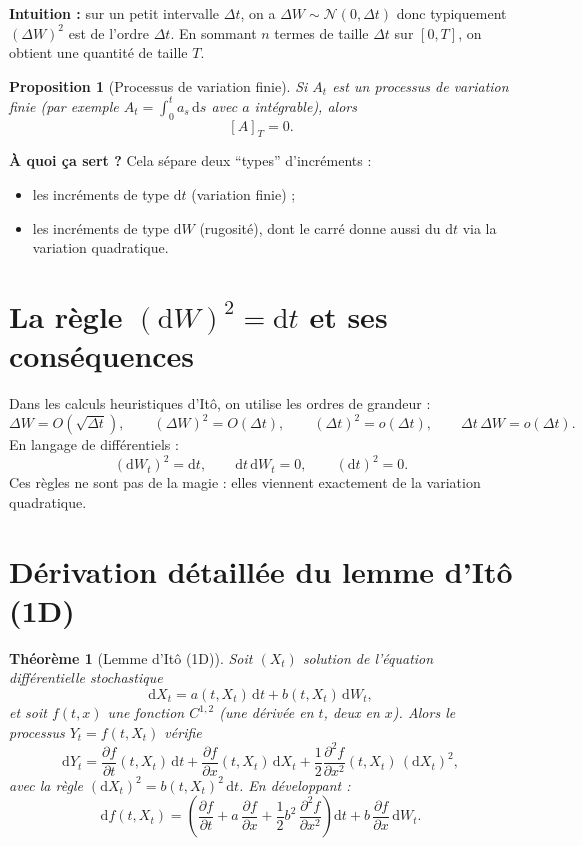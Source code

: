 \documentclass[11pt,a4paper]{report}
\newcommand{\dd}{\mathrm{d}}
\newcommand{\1}{\mathbbm{1}}
\newcommand{\Normal}{\mathcal{N}}
\newcommand{\pd}[2]{\frac{\partial #1}{\partial #2}}
\newcommand{\pdd}[2]{\frac{\partial^2 #1}{\partial #2^2}}
\theoremstyle{definition}
\theoremstyle{plain}
\newtheorem{proposition}{Proposition}[chapter]
\newtheorem{theorem}{Théorème}[chapter]
\theoremstyle{remark}
\begin{document}
\textbf{Intuition :} sur un petit intervalle $\Delta t$, on a $\Delta W \sim \Normal(0,\Delta t)$ donc typiquement $(\Delta W)^2$ est de l'ordre $\Delta t$.
En sommant $n$ termes de taille $\Delta t$ sur $[0,T]$, on obtient une quantité de taille $T$.

\begin{proposition}[Processus de variation finie]
Si $A_t$ est un processus de variation finie (par exemple $A_t=\int_0^t a_s\,\dd s$ avec $a$ intégrable),
alors
\[
[A]_T=0.
\]
\end{proposition}

\textbf{À quoi ça sert ?}
Cela sépare deux ``types'' d'incréments :
\begin{itemize}
\item les incréments de type $\dd t$ (variation finie) ;
\item les incréments de type $\dd W$ (rugosité), dont le carré donne aussi du $\dd t$ via la variation quadratique.
\end{itemize}

\section{La règle \texorpdfstring{$(\dd W)^2=\dd t$}{(dW)^2=dt} et ses conséquences}
\label{sec:dw2dt}

Dans les calculs heuristiques d'Itô, on utilise les ordres de grandeur :
\[
\Delta W = O(\sqrt{\Delta t}),\qquad (\Delta W)^2 = O(\Delta t),\qquad (\Delta t)^2 = o(\Delta t),\qquad \Delta t\,\Delta W=o(\Delta t).
\]
En langage de différentiels :
\[
(\dd W_t)^2 = \dd t,\qquad \dd t\,\dd W_t = 0,\qquad (\dd t)^2=0.
\]
Ces règles ne sont pas de la magie : elles viennent exactement de la variation quadratique.

\section{Dérivation détaillée du lemme d'Itô (1D)}
\label{sec:derive_ito}

\begin{theorem}[Lemme d'Itô (1D)]
Soit $(X_t)$ solution de l'équation différentielle stochastique
\[
\dd X_t = a(t,X_t)\,\dd t + b(t,X_t)\,\dd W_t,
\]
et soit $f(t,x)$ une fonction $C^{1,2}$ (une dérivée en $t$, deux en $x$).
Alors le processus $Y_t=f(t,X_t)$ vérifie
\[
\dd Y_t = \pd{f}{t}(t,X_t)\,\dd t + \pd{f}{x}(t,X_t)\,\dd X_t + \frac12 \pdd{f}{x}(t,X_t)\,(\dd X_t)^2,
\]
avec la règle $(\dd X_t)^2=b(t,X_t)^2\,\dd t$.
En développant :
\[
\dd f(t,X_t)
=
\left(\pd{f}{t} + a\,\pd{f}{x} + \frac12 b^2\,\pdd{f}{x}\right)\dd t
+ b\,\pd{f}{x}\,\dd W_t.
\]
\end{theorem}
\end{document}
